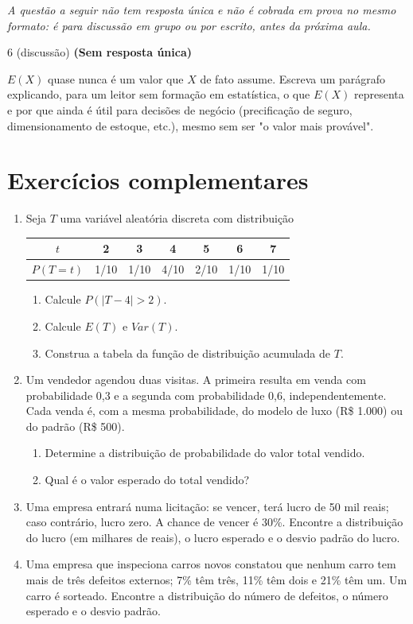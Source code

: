 \documentclass[11pt]{article}
\begin{document}
\bigskip
\noindent\textit{A questão a seguir não tem resposta única e não é cobrada em prova no mesmo
formato: é para discussão em grupo ou por escrito, antes da próxima aula.}

\begin{questao}{6 (discussão)} \textbf{(Sem resposta única)}

$E(X)$ quase nunca é um valor que $X$ de fato assume. Escreva um parágrafo explicando, para um
leitor sem formação em estatística, o que $E(X)$ representa e por que ainda é útil para decisões de
negócio (precificação de seguro, dimensionamento de estoque, etc.), mesmo sem ser "o valor mais
provável".
\end{questao}


\bigskip
\section*{Exercícios complementares}

\begin{enumerate}[label=\textbf{C\arabic*.}, leftmargin=*]
\item Seja $T$ uma variável aleatória discreta com distribuição
\begin{center}
\begin{tabular}{c|cccccc}
\toprule
$t$ & 2 & 3 & 4 & 5 & 6 & 7 \\
\midrule
$P(T = t)$ & 1/10 & 1/10 & 4/10 & 2/10 & 1/10 & 1/10 \\
\bottomrule
\end{tabular}
\end{center}
\begin{enumerate}[label=(\alph*)]
  \item Calcule $P(|T - 4| > 2)$.
  \item Calcule $E(T)$ e $Var(T)$.
  \item Construa a tabela da função de distribuição acumulada de $T$.
\end{enumerate}
\item Um vendedor agendou duas visitas. A primeira resulta em venda com probabilidade 0,3 e a segunda com probabilidade 0,6, independentemente. Cada venda é, com a mesma probabilidade, do modelo de luxo (R\$ 1.000) ou do padrão (R\$ 500).
\begin{enumerate}[label=(\alph*)]
  \item Determine a distribuição de probabilidade do valor total vendido.
  \item Qual é o valor esperado do total vendido?
\end{enumerate}
\item Uma empresa entrará numa licitação: se vencer, terá lucro de 50 mil reais; caso contrário, lucro zero. A chance de vencer é 30\%. Encontre a distribuição do lucro (em milhares de reais), o lucro esperado e o desvio padrão do lucro.
\item Uma empresa que inspeciona carros novos constatou que nenhum carro tem mais de três defeitos externos; 7\% têm três, 11\% têm dois e 21\% têm um. Um carro é sorteado. Encontre a distribuição do número de defeitos, o número esperado e o desvio padrão.

\end{enumerate}
\end{document}
